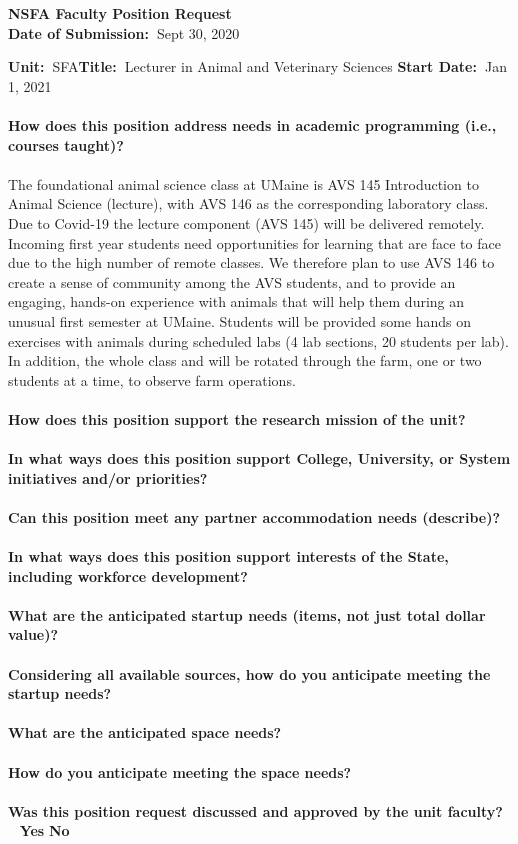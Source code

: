 \documentclass[11pt]{article}
\begin{document}
\sloppy \rmfamily
\begin{center}\textbf{NSFA Faculty Position Request\\Date of Submission:~}Sept 30, 2020\end{center}

\noindent\textbf{Unit:~}SFA\hfill\textbf{Title:~}Lecturer in Animal and Veterinary Sciences \hfill \textbf{Start Date:~}Jan 1, 2021\\~\\
\textbf{How does this position address needs in academic programming (i.e., courses taught)?}\\~\\
\small\sffamily The foundational animal science class at UMaine is AVS 145 Introduction to Animal Science (lecture), with AVS 146 as the corresponding laboratory class.  Due to Covid-19 the lecture component (AVS 145) will be delivered remotely. Incoming first year students need opportunities for learning that are face to face due to the high number of remote classes. We therefore plan to use AVS 146 to create a sense of community among the AVS students, and to provide an engaging, hands-on experience with animals that will help them during an unusual first semester at UMaine.  Students will be provided some hands on exercises with animals during scheduled labs (4 lab sections, 20 students per lab). In addition, the whole class and will be rotated through the farm, one or two students at a time, to observe farm operations.\\~\\
\textbf{\rmfamily How does this position support the research mission of the unit?}\\~\\
\newpage
\noindent\textbf{\rmfamily In what ways does this position support College, University, or System initiatives and/or priorities?}
\\~\\
\textbf{\rmfamily Can this position meet any partner accommodation needs (describe)?}\\~\\
\textbf{\rmfamily In what ways does this position support interests of the State, including workforce development?}\\~\\
\newpage\noindent\textbf{\rmfamily What are the anticipated startup needs (items, not just total dollar value)?}\\~\\
\textbf{\rmfamily Considering all available sources, how do you anticipate meeting the startup needs?}\\~\\
\textbf{\rmfamily What are the anticipated space needs?}\\~\\
\textbf{\rmfamily How do you anticipate meeting the space needs?} \\~\\
\textbf{\rmfamily Was this position request discussed and approved by the unit faculty?} \hfill ~ \hfill \textbf{\Large{\CrossedBox} \normalsize{Yes}} \hfill \textbf{\Large{\HollowBox} \normalsize{ No}}\\~\\%
\end{document}
